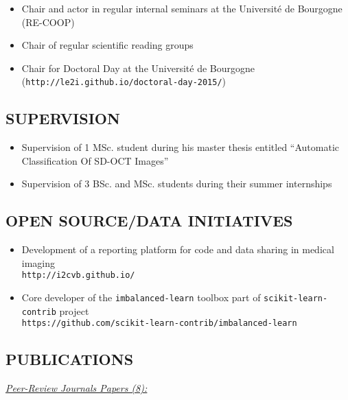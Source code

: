 {\begin{itemize}
\item Chair and actor in regular internal seminars at the Universit\'e de Bourgogne (RE-COOP)
\item Chair of regular scientific reading groups
\item Chair for Doctoral Day at the Universit\'e de Bourgogne (\texttt{http://le2i.github.io/doctoral-day-2015/})
\end{itemize}

\subsection{SUPERVISION}

\begin{itemize}
\item Supervision of 1 MSc. student during his master thesis entitled ``Automatic Classification Of SD-OCT Images''
\item Supervision of 3 BSc. and MSc. students during their summer internships
\end{itemize}


\subsection{OPEN SOURCE/DATA INITIATIVES}

\begin{itemize}
\item Development of a reporting platform for code and data sharing in medical imaging \\ \texttt{http://i2cvb.github.io/}
\item Core developer of the \texttt{imbalanced-learn} toolbox part of \texttt{scikit-learn-contrib} project \\ \texttt{https://github.com/scikit-learn-contrib/imbalanced-learn}
\end{itemize}

\subsection{PUBLICATIONS}

\underline{\textit{Peer-Review Journals Papers (8):}}

\begin{enumerate}


\end{enumerate}}
